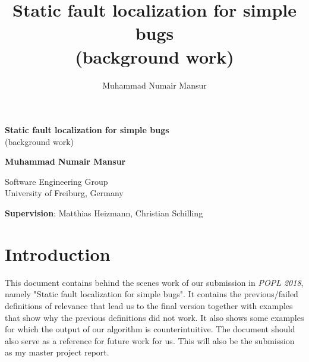 \documentclass{article}
\title{Static fault localization for simple bugs \\ \normalsize{(background work)}}
\author{Muhammad Numair Mansur}
\affil{University of Freiburg, Germany}
\date{\vspace{-5ex}}
\begin{document}
\begin{titlepage}
    \begin{center}
        \vspace*{1cm}
        \Large
        \textbf{Static fault localization for simple bugs} \\
        \large
        (background work)
        \vspace{0.5cm}
   
        
        \vspace{5cm}
        \large
        \textbf{Muhammad Numair Mansur}
                
        \vspace{0.5cm}
        
        
        Software Engineering Group\\
        University of Freiburg, Germany
        
    \end{center}
    \vspace{8cm}
    \textbf{Supervision}: Matthias Heizmann, Christian Schilling
\end{titlepage}
\section{Introduction}
This document contains behind the scenes work of our submission in \textit{POPL 2018}, namely "Static fault localization for simple bugs". It contains the previous/failed definitions of relevance that lead us to the final version together with examples that show why the previous definitions did not work. It also shows some examples for which the output of our algorithm is counterintuitive. The document should also serve as  a reference for future work for us. This will also be the submission as my master project report.
\end{document}
